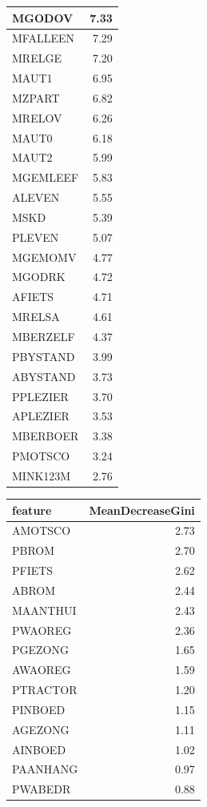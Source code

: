 \documentclass[
  12pt,
  oneside]{report}
\begin{document}
\begin{table}[H]
\begin{tabular}[t]{l|r}
\hline
MGODOV & 7.33\\
\hline
MFALLEEN & 7.29\\
\hline
MRELGE & 7.20\\
\hline
MAUT1 & 6.95\\
\hline
MZPART & 6.82\\
\hline
MRELOV & 6.26\\
\hline
MAUT0 & 6.18\\
\hline
MAUT2 & 5.99\\
\hline
MGEMLEEF & 5.83\\
\hline
ALEVEN & 5.55\\
\hline
MSKD & 5.39\\
\hline
PLEVEN & 5.07\\
\hline
MGEMOMV & 4.77\\
\hline
MGODRK & 4.72\\
\hline
AFIETS & 4.71\\
\hline
MRELSA & 4.61\\
\hline
MBERZELF & 4.37\\
\hline
PBYSTAND & 3.99\\
\hline
ABYSTAND & 3.73\\
\hline
PPLEZIER & 3.70\\
\hline
APLEZIER & 3.53\\
\hline
MBERBOER & 3.38\\
\hline
PMOTSCO & 3.24\\
\hline
MINK123M & 2.76\\
\hline
\end{tabular}
\centering
\begin{tabular}[t]{l|r}
\hline
feature & MeanDecreaseGini\\
\hline
AMOTSCO & 2.73\\
\hline
PBROM & 2.70\\
\hline
PFIETS & 2.62\\
\hline
ABROM & 2.44\\
\hline
MAANTHUI & 2.43\\
\hline
PWAOREG & 2.36\\
\hline
PGEZONG & 1.65\\
\hline
AWAOREG & 1.59\\
\hline
PTRACTOR & 1.20\\
\hline
PINBOED & 1.15\\
\hline
AGEZONG & 1.11\\
\hline
AINBOED & 1.02\\
\hline
PAANHANG & 0.97\\
\hline
PWABEDR & 0.88\\

\end{tabular}
\end{table}
\end{document}
